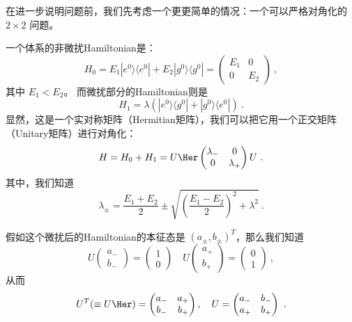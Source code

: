 在进一步说明问题前，我们先考虑一个更更简单的情况：一个可以严格对角化的 $2\times2$ 问题。

\begin{exercise}{}
一个体系的非微扰Hamiltonian是：
\begin{equation}
H_0 = E_1|e^0\rangle\langle e^0| + E_2|g^0\rangle\langle g^0| =  \left(\begin{matrix} E_1 & 0\\ 0 & E_2\end{matrix}\right)~,
\end{equation}
其中 $E_1<E_2$。 而微扰部分的Hamiltonian则是
\begin{equation}
H_1 = \lambda(|e^0\rangle\langle g^0|+|g^0\rangle\langle e^0|)~.
\end{equation}
显然，这是一个实对称矩阵（Hermitian矩阵），我们可以把它用一个正交矩阵（Unitary矩阵）进行对角化：
\begin{equation}
H = H_0+H_1 = U\Her\left(\begin{matrix} \lambda_- & 0\\0 & \lambda_+\end{matrix}\right)U~.
\end{equation}
其中，我们知道
\begin{equation}
\lambda_{\pm} = \frac{E_1+E_2}{2} \pm \sqrt{\left( \frac{E_1-E_2}{2}\right)^2 + \lambda^2}~.
\end{equation}

假如这个微扰后的Hamiltonian的本征态是 $(a_\pm,b_\pm)^T$，那么我们知道
\begin{equation}
U\left(\begin{matrix}a_-\\b_-\end{matrix}\right) = \left(\begin{matrix}1\\0\end{matrix}\right)\quad U\left(\begin{matrix}a_+\\b_+\end{matrix}\right) = \left(\begin{matrix}0\\1\end{matrix}\right)~,
\end{equation}
从而
\begin{equation}
U^T(\equiv U\Her) = \left(\begin{matrix}a_- & a_+\\b_- & b_+\end{matrix}\right), \quad U = \left(\begin{matrix}a_- & b_-\\a_+ & b_+\end{matrix}\right)~.
\end{equation}


\end{exercise}
